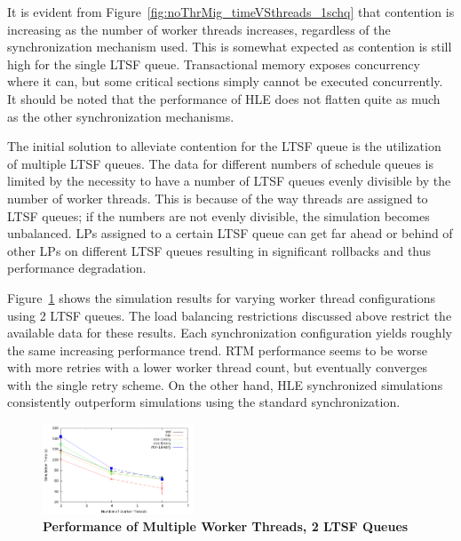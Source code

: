 \documentclass{sig-alternate}
\begin{document}
It is evident from Figure~\ref{fig:noThrMig_timeVSthreads_1schq} that contention is
increasing as the number of worker threads increases, regardless of the synchronization
mechanism used.  This is somewhat expected as contention is still high for the single LTSF
queue.  Transactional memory exposes concurrency where it can, but some critical sections
simply cannot be executed concurrently.  It should be noted that the performance of HLE
does not flatten quite as much as the other synchronization mechanisms.

The initial solution to alleviate contention for the LTSF queue is the utilization of
multiple LTSF queues.  The data for different numbers of schedule queues is limited by the
necessity to have a number of LTSF queues evenly divisible by the number of worker
threads.  This is because of the way threads are assigned to LTSF queues; if the numbers
are not evenly divisible, the simulation becomes unbalanced.  LPs assigned to a certain
LTSF queue can get far ahead or behind of other LPs on different LTSF queues resulting in
significant rollbacks and thus performance degradation.

Figure~\ref{fig:noThrMig_timeVSthreads_2schedQ} shows the simulation results for varying
worker thread configurations using 2 LTSF queues.  The load balancing restrictions
discussed above restrict the available data for these results.  Each synchronization
configuration yields roughly the same increasing performance trend.  RTM performance seems
to be worse with more retries with a lower worker thread count, but eventually converges
with the single retry scheme.  On the other hand, HLE synchronized simulations
consistently outperform simulations using the standard synchronization.

\begin{figure}
    \centering
    \graphicspath{ {./figures/} }
    \includegraphics[width=0.4\textwidth,keepaspectratio]{hugeepidemicsim-NOmig-timeVSthreads-multiset-2schQ}
    \caption{\textbf{Performance of Multiple Worker Threads, 2 LTSF Queues}}
    \label{fig:noThrMig_timeVSthreads_2schedQ}
\end{figure}
\end{document}
